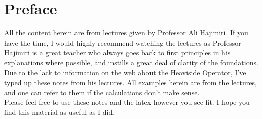 \documentclass{report}
\begin{document}
\section{Preface}
All the content herein are from \href{https://youtu.be/V-DKcohQEvg}{lectures} given by Professor Ali Hajimiri. If you have the time, I would highly recommend watching the lectures as Professor Hajimiri is a great teacher who always goes back to first principles in his explanations where possible, and instills a great deal of clarity of the foundations. \smallskip \\
Due to the lack to information on the web about the Heaviside Operator, I've typed up these notes from his lectures. All examples herein are from the lectures, and one can refer to them if the calculations don't make sense. \smallskip \\
Please feel free to use these notes and the latex however you see fit. I hope you find this material as useful as I did. 

\end{document}
